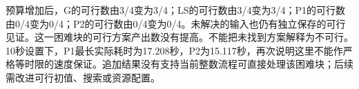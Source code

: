 预算增加后，G的可行数由3/4变为3/4；LS的可行数由3/4变为3/4；P1的可行数由0/4变为0/4；P2的可行数由0/4变为0/4。未解决的输入也仍有独立保存的可行见证。这一困难块的可行方案产出数没有提高。不能把未找到方案解释为不可行。10秒设置下，P1最长实际耗时为17.208秒，P2为15.117秒，再次说明这里不能作严格等时限的速度保证。追加结果没有支持当前整数流程可直接处理该困难块；后续需改进可行初值、搜索或资源配置。
